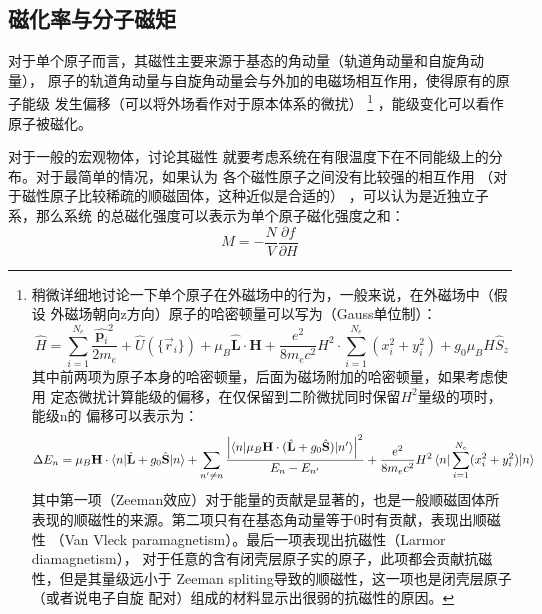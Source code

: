 \documentclass[a4paper,zihao=5,UTF8]{ctexart}
\newcommand{\mb}[1]{\mathbf{#1}}
\newcommand{\pdv}[2]{\frac{\partial{#1}}{\partial{#2}}}
\begin{document}
        \subsection{磁化率与分子磁矩}
        对于单个原子而言，其磁性主要来源于基态的角动量（轨道角动量和自旋角动量），
        原子的轨道角动量与自旋角动量会与外加的电磁场相互作用，使得原有的原子能级
        发生偏移（可以将外场看作对于原本体系的微扰）
        \footnote{
            稍微详细地讨论一下单个原子在外磁场中的行为，一般来说，在外磁场中（假设
            外磁场朝向z方向）原子的哈密顿量可以写为（Gauss单位制）：
            \begin{equation}
                \hat{H} = \sum_{i=1}^{N_e}\frac{\hat{\mb{p}_{i}}^2}{2m_e}
                + \hat{U}(\{\vec{r}_i\}) + \mu_B\hat{\mb{L}}\cdot\mb{H}
                + \frac{e^2}{8m_ec^2}H^2\cdot\sum_{i=1}^{N_e}(x_{i}^2 + y_i^{2})
                + g_0\mu_BH\hat{S}_z
            \end{equation}
            其中前两项为原子本身的哈密顿量，后面为磁场附加的哈密顿量，如果考虑使用
            定态微扰计算能级的偏移，在仅保留到二阶微扰同时保留$H^2$量级的项时，能级n的
            偏移可以表示为：
            \begin{equation}
                \Delta E_n = \mu_B\mb{H}\cdot\braket{n|\hat{\mb{L}} + g_0\hat{\mb{S}}|n}
                + \sum_{n'\neq n}\frac{\left|\braket{n|\mu_B\mb{H}\cdot(\hat{\mb{L}} + g_0\hat{\mb{S}})|n'}\right|^2}{E_n - E_{n'}}
                + \frac{e^2}{8m_ec^2}H^2\braket{n|\sum_{i=1}^{N_e}(x_i^2+y_i^2)|n}
            \end{equation}
            其中第一项（Zeeman效应）对于能量的贡献是显著的，也是一般顺磁固体所
            表现的顺磁性的来源。第二项只有在基态角动量等于0时有贡献，表现出顺磁性
            （Van Vleck paramagnetism）。最后一项表现出抗磁性（Larmor diamagnetism），
            对于任意的含有闭壳层原子实的原子，此项都会贡献抗磁性，但是其量级远小于
            Zeeman spliting导致的顺磁性，这一项也是闭壳层原子（或者说电子自旋
            配对）组成的材料显示出很弱的抗磁性的原因。\cite{solid_state_physics}
        }
        ，能级变化可以看作原子被磁化。
        \par 
        对于一般的宏观物体，讨论其磁性
        就要考虑系统在有限温度下在不同能级上的分布。对于最简单的情况，如果认为
        各个磁性原子之间没有比较强的相互作用
        （对于磁性原子比较稀疏的顺磁固体，这种近似是合适的）
        ，可以认为是近独立子系，那么系统
        的总磁化强度可以表示为单个原子磁化强度之和：
        \begin{equation}
            M = -\frac{N}{V}\pdv{f}{H}
        \end{equation}
\end{document}
